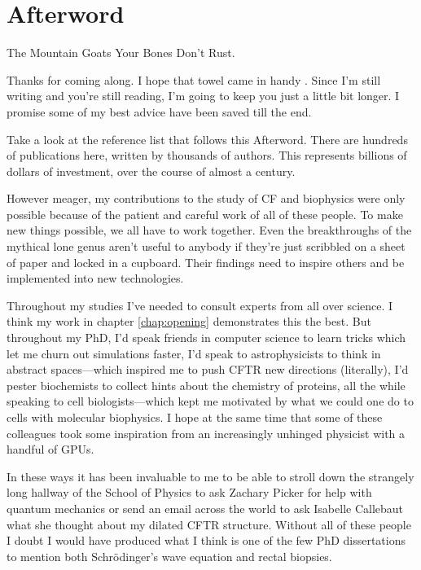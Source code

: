 \chapter{Afterword}
\label{chap:Afterword}
\begin{chapquote} {The Mountain Goats \cite{bones_dont_rust}}
Your Bones Don't Rust.
\end{chapquote}
Thanks for coming along. I hope that towel came in handy \cite{adams1979}. Since I'm still writing and you're still reading, I'm going to keep you just a little bit longer. I promise some of my best advice have been saved till the end. 

Take a look at the reference list that follows this Afterword. There are hundreds of publications here, written by thousands of authors. This represents billions of dollars of investment, over the course of almost a century. 

However meager, my contributions to the study of CF and biophysics were only possible because of the patient and careful work of all of these people. To make new things possible, we all have to work together. Even the breakthroughs of the mythical lone genus aren't useful to anybody if they're just scribbled on a sheet of paper and locked in a cupboard. Their findings need to inspire others and be implemented into new technologies.

Throughout my studies I've needed to consult experts from all over science. I think my work in chapter \ref{chap:opening} demonstrates this the best.  But throughout my PhD, I'd speak friends in computer science to learn tricks which let me churn out simulations faster, I'd speak to astrophysicists to think in abstract spaces---which inspired me to push CFTR new directions (literally), I'd pester biochemists to collect hints about the chemistry of proteins, all the while speaking to cell biologists---which kept me motivated by what we could one do to cells with molecular biophysics. I hope at the same time that some of these colleagues took some inspiration from an increasingly unhinged physicist with a handful of GPUs. 

In these ways it has been invaluable to me to be able to stroll down the strangely long hallway of the School of Physics to ask Zachary Picker for help with quantum mechanics or send an email across the world to ask Isabelle Callebaut what she thought about my dilated CFTR structure. Without all of these people I doubt I would have produced what I think is one of the few PhD dissertations to mention both Schr\"odinger's wave equation and rectal biopsies. 

